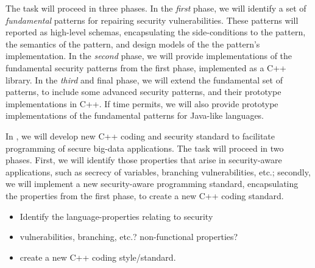 \begin{Workpackage}{\thewpno}
\begin{Task}
The task will proceed in three phases. In the \emph{first} phase, we will identify a set of \emph{fundamental} patterns for repairing security vulnerabilities. These patterns will reported as high-level schemas, encapsulating the side-conditions to the pattern, the semantics of the pattern, and design models of the the pattern's implementation.
In the \emph{second} phase, we will provide implementations of the fundamental security patterns from the first phase, implemented as a C++ library. In the \emph{third} and final phase, we will extend the fundamental set of patterns, to include some advanced security patterns, and their prototype implementations in C++. If time permits, we will also provide prototype implementations of the fundamental patterns for Java-like languages. 
\end{Task}

\begin{Task}
	
	\TaskResults{%
	}
	\TaskHeader{}
	
	In \theTask, we will develop new C++ coding and security standard to facilitate programming of secure big-data applications. The task will proceed in two phases. First, we will identify those properties that arise in security-aware applications, such as secrecy of variables, branching vulnerabilities, etc.; secondly, we will implement a new security-aware programming standard, encapsulating the properties from the first phase, to create a new C++ coding standard. 
	\begin{itemize}
		\item Identify the language-properties relating to security 
		\item vulnerabilities, branching, etc.? non-functional properties?
		\item create a new C++ coding style/standard.
	\end{itemize}
\end{Task}

\begin{Task}
	

\end{Task}
\end{Workpackage}
